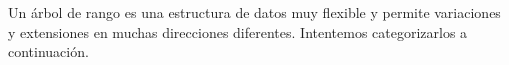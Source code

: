 Un árbol de rango es una estructura de datos muy flexible y permite variaciones y extensiones en muchas direcciones diferentes. Intentemos categorizarlos a continuación.